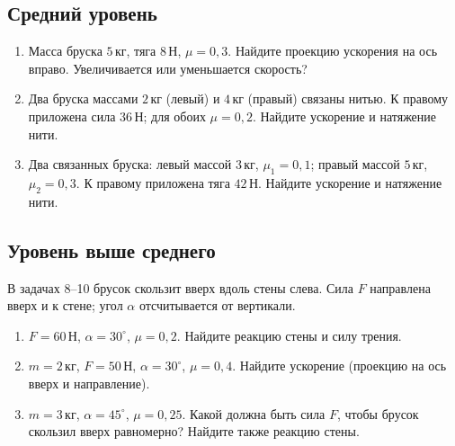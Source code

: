 \documentclass[a4paper,12pt]{article}
\newcommand{\unit}[1]{\,\text{#1}}
\begin{document}
\subsection{Средний уровень}
\begin{enumerate}[start=5,itemsep=5pt]
\item Масса бруска $5\unit{кг}$, тяга $8\unit{Н}$, $\mu=0,3$. Найдите проекцию ускорения на ось вправо. Увеличивается или уменьшается скорость?
\item Два бруска массами $2\unit{кг}$ (левый) и $4\unit{кг}$ (правый) связаны нитью. К правому приложена сила $36\unit{Н}$; для обоих $\mu=0,2$. Найдите ускорение и натяжение нити.
\item Два связанных бруска: левый массой $3\unit{кг}$, $\mu_1=0,1$; правый массой $5\unit{кг}$, $\mu_2=0,3$. К правому приложена тяга $42\unit{Н}$. Найдите ускорение и натяжение нити.
\end{enumerate}
\subsection{Уровень выше среднего}
В задачах 8--10 брусок скользит вверх вдоль стены слева. Сила $F$ направлена вверх и к стене; угол $\alpha$ отсчитывается от вертикали.
\begin{enumerate}[start=8,itemsep=5pt]
\item $F=60\unit{Н}$, $\alpha=30^\circ$, $\mu=0,2$. Найдите реакцию стены и силу трения.
\item $m=2\unit{кг}$, $F=50\unit{Н}$, $\alpha=30^\circ$, $\mu=0,4$. Найдите ускорение (проекцию на ось вверх и направление).
\item $m=3\unit{кг}$, $\alpha=45^\circ$, $\mu=0,25$. Какой должна быть сила $F$, чтобы брусок скользил вверх равномерно? Найдите также реакцию стены.
\end{enumerate}
\clearpage
\end{document}
